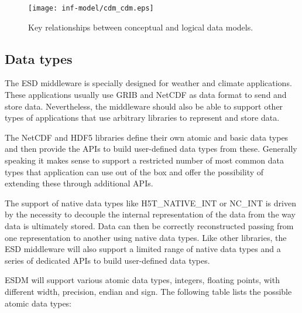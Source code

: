 \begin{figure}
	\centering
	\texttt{[image: inf-model/cdm\_cdm.eps]}
	\caption{Key relationships between conceptual and logical data models.}
	\label{fig:dm_map}
\end{figure}


%




\subsection{Data types}
\label{sec: viewpoints/logical/datatypes}


The ESD middleware is specially designed for weather and climate applications.
These applications usually use GRIB and NetCDF as data format to send and store
data. Nevertheless, the middleware should also be able to support other types of
applications that use arbitrary libraries to represent and store data.

The NetCDF and HDF5 libraries define their own atomic and basic data types and then provide the APIs to build user-defined data types from these. Generally
speaking it makes sense to support a restricted number of most common data types
that application can use out of the box and offer the possibility of extending
these through additional APIs.

The support of native data types like H5T\_NATIVE\_INT or NC\_INT is driven by the necessity to decouple the internal representation of the data from the way data is ultimately stored.
Data can then be correctly reconstructed passing from one representation to another using native data types.
Like other libraries, the ESD middleware will also support a limited range of native data types and a series of dedicated APIs to build user-defined data types.

\medskip

ESDM will support various atomic data types, integers, floating points, with
different width, precision, endian and sign. The following table lists the
possible atomic data types:


